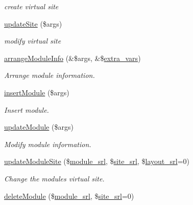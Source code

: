 \begin{DoxyCompactItemize}
\begin{DoxyCompactList}\small\item\em create virtual site \end{DoxyCompactList}\item 
\hyperlink{classmoduleController_ae2fb61c8a558f0552202c51d2055eede}{update\+Site} (\$args)
\begin{DoxyCompactList}\small\item\em modify virtual site \end{DoxyCompactList}\item 
\hyperlink{classmoduleController_a4c5f4174ead13e475ea863184bf657d6}{arrange\+Module\+Info} (\&\$args, \&\$\hyperlink{ko_8install_8php_ae1dcb37fc34a8f312d2e6abd6f806743}{extra\+\_\+vars})
\begin{DoxyCompactList}\small\item\em Arrange module information. \end{DoxyCompactList}\item 
\hyperlink{classmoduleController_a8876924470cbfa94679d73dc6fc61332}{insert\+Module} (\$args)
\begin{DoxyCompactList}\small\item\em Insert module. \end{DoxyCompactList}\item 
\hyperlink{classmoduleController_ae4a1e785f41aa56a626b7f72346bbe0c}{update\+Module} (\$args)
\begin{DoxyCompactList}\small\item\em Modify module information. \end{DoxyCompactList}\item 
\hyperlink{classmoduleController_a9b1b3b8db4047c33882a9231c5eafb13}{update\+Module\+Site} (\$\hyperlink{ko_8install_8php_a370bb6450fab1da3e0ed9f484a38b761}{module\+\_\+srl}, \$\hyperlink{ko_8install_8php_a8b1406b4ad1048041558dce6bfe89004}{site\+\_\+srl}, \$\hyperlink{ko_8install_8php_a70054876db09b2519a1726663c8dd9e7}{layout\+\_\+srl}=0)
\begin{DoxyCompactList}\small\item\em Change the module\textquotesingle{}s virtual site. \end{DoxyCompactList}\item 
\hyperlink{classmoduleController_add52eeb3f4a3cb900376af8007c09655}{delete\+Module} (\$\hyperlink{ko_8install_8php_a370bb6450fab1da3e0ed9f484a38b761}{module\+\_\+srl}, \$\hyperlink{ko_8install_8php_a8b1406b4ad1048041558dce6bfe89004}{site\+\_\+srl}=0)
\item 

\end{DoxyCompactItemize}
